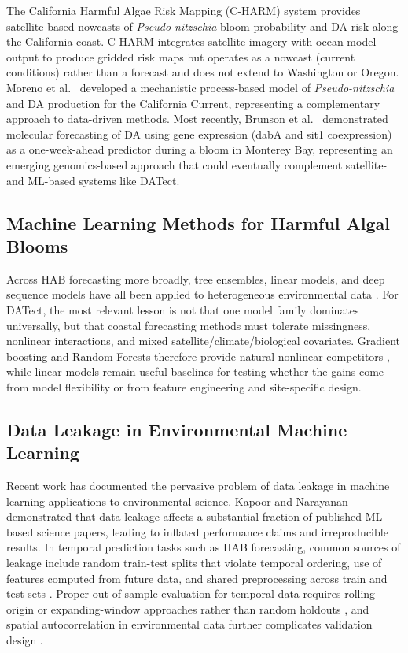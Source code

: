 \documentclass[toxins,article,submit,moreauthors]{Definitions/mdpi}
\begin{document}
The California Harmful Algae Risk Mapping (C-HARM) system \cite{Anderson2016} provides satellite-based nowcasts of \textit{Pseudo-nitzschia} bloom probability and DA risk along the California coast. C-HARM integrates satellite imagery with ocean model output to produce gridded risk maps but operates as a nowcast (current conditions) rather than a forecast and does not extend to Washington or Oregon. Moreno et al.\ \cite{Moreno2022} developed a mechanistic process-based model of \textit{Pseudo-nitzschia} and DA production for the California Current, representing a complementary approach to data-driven methods. Most recently, Brunson et al.\ \cite{Brunson2024} demonstrated molecular forecasting of DA using gene expression (dabA and sit1 coexpression) as a one-week-ahead predictor during a bloom in Monterey Bay, representing an emerging genomics-based approach that could eventually complement satellite- and ML-based systems like DATect.

\subsection{Machine Learning Methods for Harmful Algal Blooms}
\label{sec:rw-ml-habs}

Across HAB forecasting more broadly, tree ensembles, linear models, and deep sequence models have all been applied to heterogeneous environmental data \cite{Cruz2021, Shin2024, Hill2020, Yu2021, Manning2019}. For DATect, the most relevant lesson is not that one model family dominates universally, but that coastal forecasting methods must tolerate missingness, nonlinear interactions, and mixed satellite/climate/biological covariates. Gradient boosting and Random Forests therefore provide natural nonlinear competitors \cite{Friedman2001, Chen2016, Breiman2001}, while linear models remain useful baselines for testing whether the gains come from model flexibility or from feature engineering and site-specific design.

\subsection{Data Leakage in Environmental Machine Learning}
\label{sec:rw-leakage}

Recent work has documented the pervasive problem of data leakage in machine learning applications to environmental science. Kapoor and Narayanan \cite{Kapoor2023} demonstrated that data leakage affects a substantial fraction of published ML-based science papers, leading to inflated performance claims and irreproducible results. In temporal prediction tasks such as HAB forecasting, common sources of leakage include random train-test splits that violate temporal ordering, use of features computed from future data, and shared preprocessing across train and test sets \cite{Kaufman2012, Roberts2017, Bergmeir2012}. Proper out-of-sample evaluation for temporal data requires rolling-origin or expanding-window approaches rather than random holdouts \cite{Tashman2000}, and spatial autocorrelation in environmental data further complicates validation design \cite{Valavi2019}.
\end{document}

